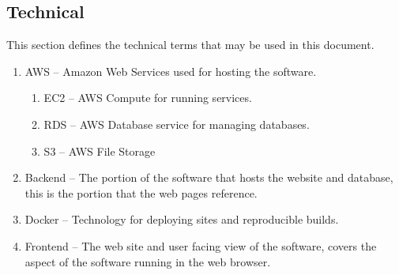 	\subsection{Technical}
	This section defines the technical terms that may be used in this document.
	\begin{enumerate}[leftmargin=3\parindent]
		\item AWS -- Amazon Web Services used for hosting the software.
		\begin{enumerate}[leftmargin=3\parindent]
			\item EC2 -- AWS Compute for running services.
			\item RDS -- AWS Database service for managing databases.
			\item S3 -- AWS File Storage
		\end{enumerate}
		\item Backend -- The portion of the software that hosts the website and database, this is the portion that the web pages reference.
		\item Docker -- Technology for deploying sites and reproducible builds.
		\item Frontend -- The web site and user facing view of the software, covers the aspect of the software running in the web browser.
	\end{enumerate}

	\documentsGlossary




